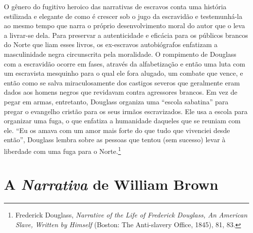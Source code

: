 O gênero do fugitivo heroico das narrativas de escravos conta uma
história estilizada e elegante de como é crescer sob o jugo da
escravidão e testemunhá-la ao mesmo tempo que narra o próprio
desenvolvimento moral do autor que o leva a livrar-se dela. Para
preservar a autenticidade e eficácia para os públicos brancos do Norte
que liam esses livros, os ex-escravos autobiógrafos enfatizam a
masculinidade negra circunscrita pela moralidade. O rompimento de
Douglass com a escravidão ocorre em fases, através da alfabetização e
então uma luta com um escravista mesquinho para o qual ele fora alugado,
um combate que vence, e então como se salva miraculosamente dos castigos
severos que geralmente eram dados aos homens negros que revidavam contra
agressores brancos. Em vez de pegar em armas, entretanto, Douglass
organiza uma ``escola sabatina'' para pregar o evangelho cristão para os
seus irmãos escravizados. Ele usa a escola para organizar uma fuga, o
que enfatiza a humanidade daqueles que se reuniam com ele. ``Eu os amava
com um amor mais forte do que tudo que vivenciei desde então'', Douglass
lembra sobre as pessoas que tentou (sem sucesso) levar à liberdade com
uma fuga para o Norte.\footnote{Frederick Douglass, \emph{Narrative of
  the Life of Frederick Douglass, An American Slave, Written by Himself}
  (Boston: The Anti-slavery Office, 1845), 81, 83.}

\section{A \emph{Narrativa} de William Brown}

